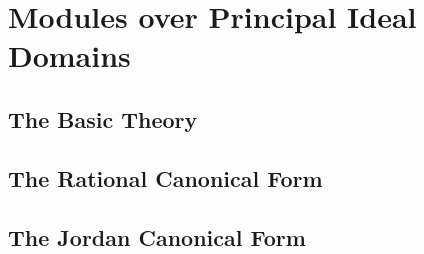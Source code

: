 \chapter{Modules over Principal Ideal Domains}

\section{The Basic Theory}

\section{The Rational Canonical Form}

\section{The Jordan Canonical Form}